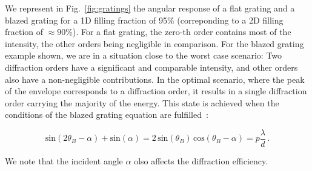 \documentclass[12pt]{iopart}
\begin{document}
We represent in Fig.~\ref{fig:gratings} the angular response of a flat grating and a blazed grating
for a 1D filling fraction of 95\% (correponding to a 2D filling fraction of $\approx 90$\%).
For a flat grating, the zero-th order contains most of the intensity,
the other orders being negligible in comparison.
For the blazed grating example shown,
we are in a situation close to the worst case scenario:
Two diffraction orders have a significant and comparable intensity,
and other orders also have a non-negligible contributions.
In the optimal scenario, where the peak of the envelope corresponds to a diffraction order,
it results in a single diffraction order carrying the majority of the energy.
This state is achieved when the conditions of the blazed grating equation are fulfilled~\cite{Casini2014on}:



\begin{equation}
  \text{sin}(2\theta_B-\alpha) + \text{sin}(\alpha)
  = 2 \,\text{sin}(\theta_B)  \,\text{cos}(\theta_B-\alpha)
  = p\frac{\lambda}{d} \, .
  \label{eq:blazed_eq}
\end{equation}

\noindent We note that the incident angle $\alpha$ olso affects the diffraction efficiency.
\end{document}
